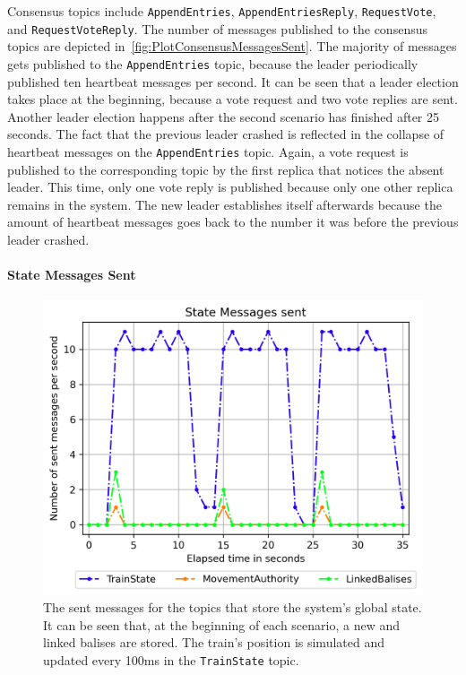 Consensus topics include \texttt{AppendEntries}, \texttt{AppendEntriesReply}, \texttt{RequestVote}, and \texttt{RequestVoteReply}.
The number of messages published to the consensus topics are depicted in~\autoref{fig:PlotConsensusMessagesSent}.
The majority of messages gets published to the \texttt{AppendEntries} topic, because the leader periodically published ten heartbeat messages per second.
It can be seen that a leader election takes place at the beginning, because a vote request and two vote replies are sent.
Another leader election happens after the second scenario has finished after 25 seconds.
The fact that the previous leader crashed is reflected in the collapse of heartbeat messages on the \texttt{AppendEntries} topic.
Again, a vote request is published to the corresponding topic by the first replica that notices the absent leader.
This time, only one vote reply is published because only one other replica remains in the system.
The new leader establishes itself afterwards because the amount of heartbeat messages goes back to the number it was before the previous leader crashed.


\paragraph{State Messages Sent}

\begin{figure}[!hb]
	\centering
	\includegraphics[width=0.75\linewidth]{images/plots/StateMessagesSent}
	\caption{The sent messages for the topics that store the system's global state. It can be seen that, at the beginning of each scenario, a new  and linked balises are stored. The train's position is simulated and updated every 100ms in the \texttt{TrainState} topic.}
	\label{fig:PlotStateMessagesSent}
\end{figure}

